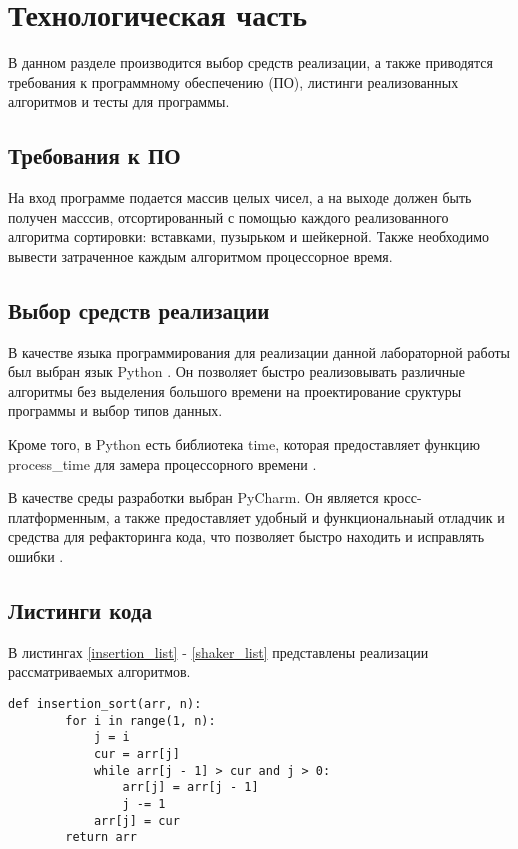 \chapter{Технологическая часть}

В данном разделе производится выбор средств реализации, а также приводятся требования к программному обеспечению (ПО), листинги реализованных алгоритмов и тесты для программы.

\section{Требования к ПО}

На вход программе подается массив целых чисел, а на выходе должен быть получен масссив, отсортированный с помощью каждого реализованного алгоритма сортировки: вставками, пузырьком и шейкерной. Также необходимо вывести затраченное каждым алгоритмом процессорное время.

\section{Выбор средств реализации}

В качестве языка программирования для реализации данной лабораторной работы был выбран язык Python  \cite{PythonBook}. Он позволяет быстро реализовывать различные алгоритмы без выделения большого времени на проектирование сруктуры программы и выбор типов данных. 

Кроме того, в Python есть библиотека time, которая предоставляет функцию process\_time для замера процессорного времени \cite{process_time_text}.

В качестве среды разработки выбран PyCharm. Он является кросс-платформенным, а также предоставляет удобный и функциональнаый отладчик и средства для рефакторинга кода, что позволяет быстро находить и исправлять ошибки \cite{pycharm}.

\section{Листинги кода}

В листингах \ref{insertion_list} - \ref{shaker_list} представлены реализации рассматриваемых алгоритмов.

\begin{lstlisting}[caption=Реализация алгоритма сортировки вставками,
	label={insertion_list}]
	def insertion_sort(arr, n):
		for i in range(1, n):
			j = i
			cur = arr[j]
			while arr[j - 1] > cur and j > 0:
				arr[j] = arr[j - 1]
				j -= 1
			arr[j] = cur
		return arr
\end{lstlisting}



